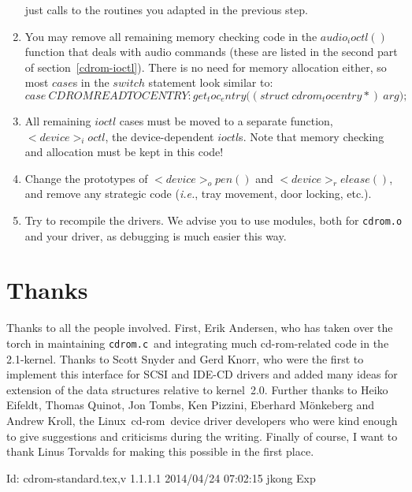 \documentclass{article}
\def\version{$Id: cdrom-standard.tex,v 1.1.1.1 2014/04/24 07:02:15 jkong Exp $}
\newcommand{\newsection}[1]{\newpage\section{#1}}
\def\linux{{\sc Linux}}
\def\cdrom{{\sc cd-rom}}
\def\cdromc{{\tt {cdrom.c}}}
\def\fo{\sl}                    %
\def\ie{{\fo i.e.}}
\begin{document}
\begin{enumerate}
  just calls to the routines you adapted in the previous step.
\item You may remove all remaining memory checking code in the
  $audio_ioctl()$ function that deals with audio commands (these are
  listed in the second part of section~\ref{cdrom-ioctl}). There is no
  need for memory allocation either, so most $case$s in the $switch$
  statement look similar to:
  $$
  case\ CDROMREADTOCENTRY\colon get_toc_entry\bigl((struct\ 
  cdrom_tocentry *{})\ arg\bigr);
  $$
\item All remaining $ioctl$ cases must be moved to a separate
  function, $<device>_ioctl$, the device-dependent $ioctl$s. Note that
  memory checking and allocation must be kept in this code!
\item Change the prototypes of $<device>_open()$ and
  $<device>_release()$, and remove any strategic code (\ie, tray
  movement, door locking, etc.).
\item Try to recompile the drivers. We advise you to use modules, both
  for {\tt {cdrom.o}} and your driver, as debugging is much easier this
  way.
\end{enumerate} 

\newsection{Thanks}

Thanks to all the people involved.  First, Erik Andersen, who has
taken over the torch in maintaining \cdromc\ and integrating much
\cdrom-related code in the 2.1-kernel.  Thanks to Scott Snyder and
Gerd Knorr, who were the first to implement this interface for SCSI
and IDE-CD drivers and added many ideas for extension of the data
structures relative to kernel~2.0.  Further thanks to Heiko Ei{\sz}feldt,
Thomas Quinot, Jon Tombs, Ken Pizzini, Eberhard M\"onkeberg and Andrew
Kroll, the \linux\ \cdrom\ device driver developers who were kind
enough to give suggestions and criticisms during the writing. Finally
of course, I want to thank Linus Torvalds for making this possible in
the first place.

\vfill
$ \version\ $
\eject
\end{document}

